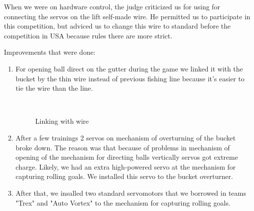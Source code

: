 When we were on hardware control, the judge criticized us for using for connecting the servos on the lift self-made wire. He permitted us to participate in this competition, but adviced us to change this wire to standard before the competition in USA because rules there are more strict.

Improvements that were done:
\begin{enumerate}
	\item For opening ball direct on the gutter during the game we linked it with the bucket by the thin wire instead of previous fishing line because it's easier to tie the wire than the line.
	\begin{figure}[H]
		\begin{minipage}[h]{0.2\linewidth}
			\center  
		\end{minipage}
		\begin{minipage}[h]{0.6\linewidth}
			\caption{Linking with wire}
		\end{minipage}
	\end{figure}
	
	\item After a few trainings 2 servos on mechanism of overturning of the bucket broke down. The reason was that because of problems in mechanism of opening of the mechanism for directing balls vertically servos got extreme charge. Likely, we had an extra high-powered servo at the mechanism for capturing rolling goals. We installed this servo to the bucket overturner. 
	
	\item After that, we insalled two standard servomotors that we borrowed in teams "Trex" and "Auto Vortex" to the mechanism for capturing rolling goals.
	

\end{enumerate}
